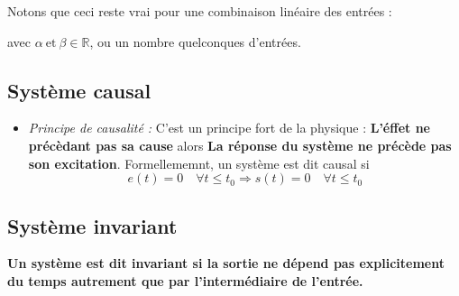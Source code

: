 \begin{itemize}
    Notons que ceci reste vrai pour une combinaison linéaire des entrées :
    \begin{center}
    \end{center}
    avec $\alpha\ \text{et}\ \beta\in\mathbb{R}$, ou un nombre quelconques 
    d'entrées.
\end{itemize}

\subsection{Système causal}
\begin{itemize}
    \item \emph{Principe de causalité :}
        C'est un principe fort de la physique :
        \textbf{\og L'éffet ne précèdant pas sa cause\fg} alors 
        \textbf{\og La réponse du système ne précède pas son excitation\fg}.
        Formellememnt, un système est dit causal si 
        $$e(t)=0\quad\forall t\le t_0 \Rightarrow s(t)=0\quad\forall t\le t_0$$
\end{itemize}

\subsection{Système invariant}
\textbf{Un système est dit invariant si la sortie ne dépend pas 
explicitement du temps autrement que par l'intermédiaire de l'entrée.}

